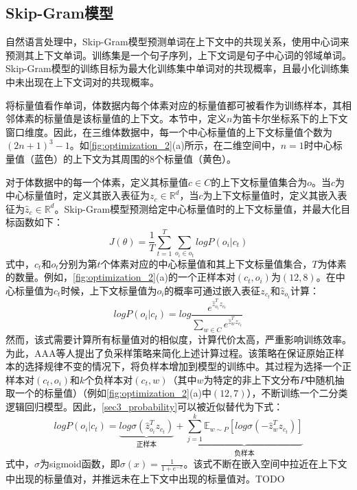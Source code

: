 \subsection{Skip-Gram模型}

自然语言处理中，Skip-Gram模型预测单词在上下文中的共现关系，使用中心词来预测其上下文单词。训练集是一个句子序列，上下文词是句子中心词的邻域单词。Skip-Gram模型的训练目标为最大化训练集中单词对的共现概率，且最小化训练集中未出现在上下文词对的共现概率。

将标量值看作单词，体数据内每个体素对应的标量值都可被看作为训练样本，其相邻体素的标量值是该标量值的上下文。本节中，定义$n$为笛卡尔坐标系下的上下文窗口维度。因此，在三维体数据中，每一个中心标量值的上下文标量值个数为$(2n+1)^3-1$。如\autoref{fig:optimization_2}(a)所示，在二维空间中，$n=1$时中心标量值（蓝色）的上下文为其周围的8个标量值（黄色）。

对于体数据中的每一个体素，定义其标量值$c \in C$的上下文标量值集合为$o$。当$c$为中心标量值时，定义其嵌入表征为$z_c \in \mathbb{R}^d$，当$c$为上下文标量值时，定义其嵌入表征为$\hat{z}_c \in \mathbb{R}^d$。Skip-Gram模型预测给定中心标量值时的上下文标量值，并最大化目标函数如下：
\begin{equation}
    J(\theta)=\frac{1}{T}\sum_{t=1}^{T}\sum_{o_i \in o_t}log P(o_i|c_t)
\end{equation}
式中，$c_t$和$o_t$分别为第$t$个体素对应的中心标量值和其上下文标量值集合，$T$为体素的数量。例如，\autoref{fig:optimization_2}(a)的一个正样本对$(c_t, o_i)$为$(12,8)$。在中心标量值为$c_t$时候，上下文标量值为$o_i$的概率可通过嵌入表征$z_{c_t}$和$\hat{z}_{o_i}$计算：
\begin{equation}\label{sec3_probability}
    log P(o_i|c_t) = log \frac{e^{\hat{z}_{o_i}^{T}z_{c_t}}}{\sum_{w \in C} e^{\hat{z}_{w}^{T}z_{c_t}}}
\end{equation}
然而，该式需要计算所有标量值对的相似度，计算代价太高，严重影响训练效率。为此，AAA等人提出了负采样策略来简化上述计算过程。该策略在保证原始正样本的选择规律不变的情况下，将负样本增加到模型的训练中。其过程为选择一个正样本对$(c_t,o_i)$和$k$个负样本对$(c_t, w)$（其中$w$为特定的非上下文分布$P$中随机抽取一个的标量值）（例如\autoref{fig:optimization_2}(a)中$(12,7)$），不断训练一个二分类逻辑回归模型。因此，\autoref{sec3_probability}可以被近似替代为下式：
\begin{equation}\label{sec3_approximate}
    log P(o_i|c_t) = \underbrace{log \sigma(\hat{z}_{o_i}^{T}z_{c_t})}_{\text{正样本}} + \underbrace{\sum_{j=1}^{k}\mathbb{E}_{w \sim P}[log \sigma(-\hat{z}_{w}^{T}z_{c_t})]}_{\text{负样本}}
\end{equation}
式中，$\sigma$为sigmoid函数，即$\sigma(x)=\frac{1}{1+e^{-x}}$。该式不断在嵌入空间中拉近在上下文中出现的标量值对，并推远未在上下文中出现的标量值对。TODO

